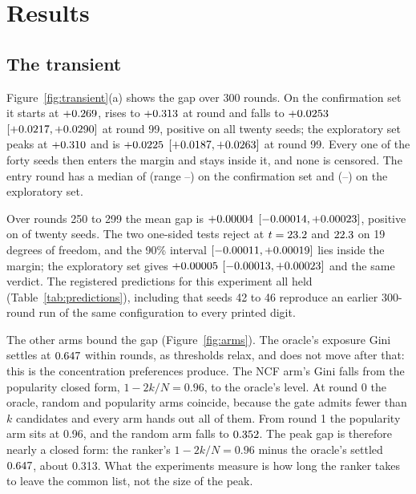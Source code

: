 
\section{Results}
\label{sec:results}

\subsection{The transient}
\label{sec:transient}

Figure~\ref{fig:transient}(a) shows the gap over 300 rounds. On the confirmation
set it starts at $+0.269$, rises to $+0.313$ at round \peakRound{} and falls to
$+0.0253$ $[+0.0217, +0.0290]$ at round 99, positive on
all twenty seeds; the exploratory set peaks at $+0.310$ and is
$+0.0225$ $[+0.0187, +0.0263]$ at round 99.
Every one of the forty seeds then enters the margin and stays inside it, and none
is censored. The entry round has a median of \entryMedianConf{} (range
\entryMinConf{}--\entryMaxConf{}) on the confirmation set and \entryMedianExpl{}
(\entryMinExpl{}--\entryMaxExpl{}) on the exploratory set.

Over rounds 250 to 299 the mean gap is $+0.00004$ $[-0.00014, +0.00023]$,
positive on \tailConfPos{} of twenty seeds. The two one-sided tests reject at
$t = 23.2$ and $22.3$ on 19 degrees of freedom, and the 90\%
interval $[-0.00011, +0.00019]$ lies inside the margin; the exploratory set
gives $+0.00005$ $[-0.00013, +0.00023]$ and the same verdict. The registered
predictions for this experiment all held (Table~\ref{tab:predictions}), including
that seeds 42 to 46 reproduce an earlier 300-round run of the same configuration
to every printed digit.

The other arms bound the gap (Figure~\ref{fig:arms}). The oracle's exposure Gini
settles at $0.647$ within \oracleSettle{} rounds, as thresholds relax,
and does not move after that: this is the concentration preferences produce. The
NCF arm's Gini falls from the popularity closed form, $1 - 2k/N = 0.96$, to the
oracle's level. At round 0 the oracle, random and popularity arms coincide, because the gate
admits fewer than $k$ candidates and every arm hands out all of them. From round 1
the popularity arm sits at 0.96, and the random arm falls to $0.352$.
The peak gap is therefore nearly a closed form: the ranker's $1 - 2k/N = 0.96$
minus the oracle's settled $0.647$, about 0.313. What the experiments
measure is how long the ranker takes to leave the common list, not the size of the
peak.

